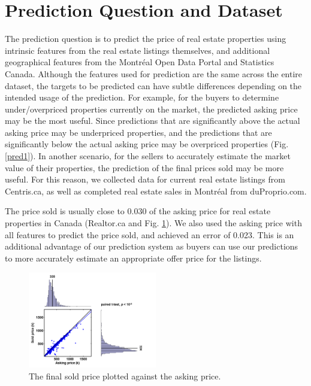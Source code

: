 \documentclass[conference]{IEEEtran}
\begin{document}
\section{Prediction Question and Dataset}
The prediction question is to predict the price of real estate properties using intrinsic features from the real estate listings themselves, and additional geographical features from the Montr\'eal Open Data Portal and Statistics Canada. Although the features used for prediction are the same across the entire dataset, the targets to be predicted can have subtle differences depending on the intended usage of the prediction. For example, for the buyers to determine under/overpriced properties currently on the market, the predicted asking price may be the most useful. Since predictions that are significantly above the actual asking price may be underpriced properties, and the predictions that are significantly below the actual asking price may be overpriced properties (Fig. \ref{pred1}). In another scenario, for the sellers to accurately estimate the market value of their properties, the prediction of the final prices sold may be more useful. For this reason, we collected data for current real estate listings from Centris.ca, as well as completed real estate sales in Montr\'eal from duProprio.com.

The price sold is usually close to 0.030 of the asking price for real estate properties in Canada (Realtor.ca and Fig. \ref{askVsold}). We also used the asking price with all features to predict the price sold, and achieved an error of 0.023. This is an additional advantage of our prediction system as buyers can use our predictions to more accurately estimate an appropriate offer price for the listings.\\

\begin{figure}[H]
\centering
\includegraphics[width=0.5\textwidth]{askingVsSold.png}
\caption{\scriptsize The final sold price plotted against the asking price.}
\label{askVsold}
\end{figure}
\end{document}
